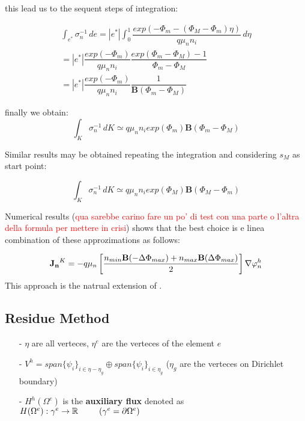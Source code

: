 this lead us to the sequent steps of integration:

\begin{multline*}
\int_{e^*} \sigma_n^{-1} \, de = |e^*| \int_0^1 \dfrac{exp \left(-\Phi_m - (\Phi_M-\Phi_m)\eta \right)}{q\mu_n n_i} 
 \, d\eta \\
 = |e^*|\dfrac{exp (-\Phi_m)}{q\mu_n n_i} \dfrac{exp ( \Phi_m-\Phi_M)-1}{\Phi_m-\Phi_M} \\
 =  |e^*|\dfrac{exp (-\Phi_m)}{q\mu_n n_i} \dfrac{1}{\mathbf{B}(\Phi_m-\Phi_M)}
\end{multline*}

finally we obtain:
\begin{equation}
\label{eq: finally approzimation 3D to 1D}
\int_{K} \sigma_n^{-1} \, dK \simeq  q \mu_n n_i exp(\Phi_m) \mathbf{B}(\Phi_m-\Phi_M)
\end{equation}

Similar results may be obtained repeating the integration and considering $s_M$ as start point:

\begin{equation}
\int_{K} \sigma_n^{-1} \, dK \simeq  q \mu_n n_i exp(\Phi_M) \mathbf{B}(\Phi_M-\Phi_m)
\end{equation}

Numerical results (\textcolor{red}{qua sarebbe carino fare un po' di test con una parte o l'altra della formula per mettere in crisi}) shows that the best choice is e linea combination of these approzimations as follows:

\begin{equation}
\label{eq: first formula for J}
\mathbf{J_n}^K = -  q \mu_n  \left[ \dfrac{ n_{min} \mathbf{B}(-\Delta \Phi_{max})  + n_{max}\mathbf{B}(\Delta \Phi_{max})}{2} \right]\nabla \varphi_n^h
\end{equation}
This approach is the natrual extension of .




\subsection{Residue Method}

\begin{itemize}
\item[-] $\eta$ are all verteces, $\eta^e$ are the verteces of the element $e$
\item[-] $V^h=span\{\psi_i\}_{i\in \eta-\eta_g}\oplus span\{\psi_i\}_{i\in \eta_g}$  ($\eta_g$ are the verteces on Dirichlet boundary)
\item[-] $H^h(\Omega^e)$ is the \textbf{auxiliary flux} denoted as $H(\Omega^e):\gamma^e\rightarrow\mathbb{R} \psp{15}(\gamma^e=\partial \Omega^e)$
\end{itemize}

